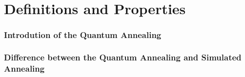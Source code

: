 \documentclass{beamer}
\begin{document}
\section{Definitions and Properties}
%	
%	
%		

\begin{frame}
	\frametitle{Introdution of the Quantum Annealing}
\end{frame}

\begin{frame}
	\frametitle{Difference between the Quantum Annealing and Simulated Annealing}
\end{frame}
\end{document}
